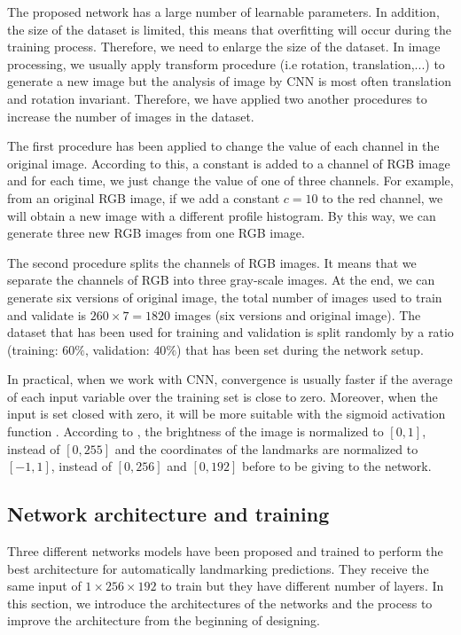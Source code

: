 \documentclass[conference]{IEEEtran}
\begin{document}
The proposed network has a large number of learnable parameters. In addition, the size of the dataset is limited, this means that overfitting will occur during the training process. Therefore, we need to enlarge the size of the dataset. In image processing, we usually apply transform procedure (i.e rotation, translation,...) to generate a new image but the analysis of image by CNN is most often translation and rotation invariant. Therefore, we have applied two another procedures to increase the number of images in the dataset.

The first procedure has been applied to change the value of each channel in the original image. According to this, a constant is added to a channel of RGB image and for each time, we just change the value of one of three channels. For example, from an original RGB image, if we add a constant $c = 10$ to the red channel, we will obtain a new image with a different profile histogram. By this way, we can generate three new RGB images from one RGB image.

The second procedure splits the channels of RGB images. It means that we separate the channels of RGB into three gray-scale images. At the end, we can generate six versions of original image, the total number of images used to train and validate is $260 \times 7 = 1820$ images (six versions and original image). The dataset that has been used for training and validation is split randomly by a ratio (training: $60\%$, validation: $40\%$) that has been set during the network setup.

In practical, when we work with CNN, convergence is usually faster if the average of each input variable over the training set is close to zero. Moreover, when the input is set closed with zero, it will be more suitable with the sigmoid activation function \cite{lecun2012efficient}. According to \cite{lecun2012efficient}, the brightness of the image is normalized to $[0,1]$, instead of $[0,255]$ and the coordinates of the landmarks are normalized to $[-1,1]$, instead of $[0,256]$ and $[0,192]$ before to be giving to the network.
\subsection{Network architecture and training}
Three different networks models have been proposed and trained to perform the best architecture for automatically landmarking predictions. They receive the same input of $1 \times 256 \times 192$ to train but they have different number of layers. In this section, we introduce the architectures of the networks and the process to improve the architecture from the beginning of designing.
\end{document}
